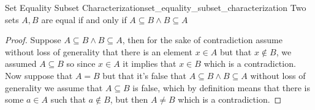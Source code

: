 \begin{proposition}{Set Equality Subset Characterization}{set_equality_subset_characterization}
    Two sets \( A, B \) are equal if and only if \( A \subseteq B \land B
    \subseteq A \)
\end{proposition}
\begin{proof}
    Suppose \( A \subseteq B \land  B \subseteq A \), then for the sake of
    contradiction assume without loss of generality that there is an element \(
    x \in  A\) but that \( x \not\in B \), we assumed \( A \subseteq B \) so
    since \( x \in  A \) it implies that \( x \in  B \) which is a
    contradiction.\\
    Now suppose that \( A = B \) but that it's false that \( A \subseteq B \land
    B \subseteq A\) without loss of generality we assume that \( A \subseteq B
    \) is false, which by definition means that there is some \( a \in  A \)
    such that \( a \not\in B \), but then \( A \neq B \) which is a
    contradiction.
\end{proof}
